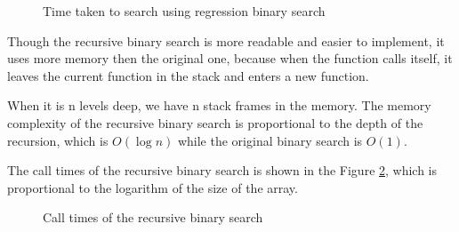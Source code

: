 \documentclass[a4paper,11pt]{article}
\begin{document}
\begin{figure}[H]
  \centering
  \caption{Time taken to search using regression binary search}
  \label{fig:recursive_search}
\end{figure}

Though the recursive binary search is more readable and easier to implement, 
it uses more memory then the original one, because when the function calls itself,
it leaves the current function in the stack and enters a new function.

When it is n levels deep, we have n stack frames in the memory.
The memory complexity of the recursive binary 
search is proportional to the depth of the recursion,  
which is $O(\log n)$ while the original binary search is $O(1)$.

The call times of the recursive binary search is shown in the Figure \ref{fig:recursive_call},
which is proportional to the logarithm of the size of the array.

\begin{figure}[H]
  \centering
  \caption{Call times of the recursive binary search}
  \label{fig:recursive_call}
\end{figure}
\end{document}
